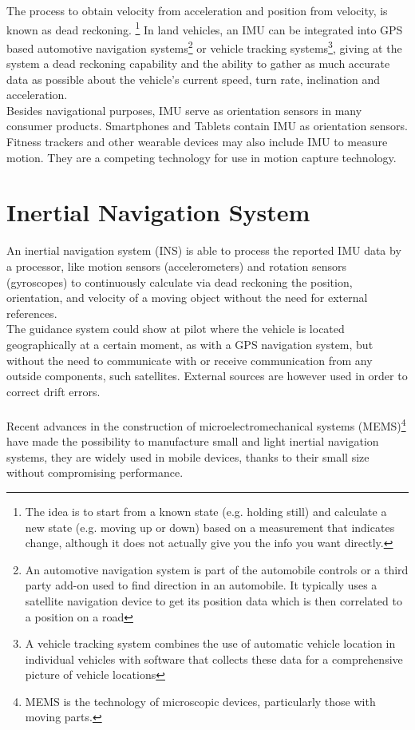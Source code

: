 \documentclass[tesi]{subfiles}
\begin{document}
The process to obtain velocity from acceleration and position from velocity, is known as dead reckoning. \footnote{The idea is to start from a known state (e.g. holding still) and calculate a new state (e.g. moving up or down) based on a measurement that indicates change, although it does not actually give you the info you want directly.}
In land vehicles, an IMU can be integrated into GPS based automotive navigation systems\footnote{An automotive navigation system is part of the automobile controls or a third party add-on used to find direction in an automobile. It typically uses a satellite navigation device to get its position data which is then correlated to a position on a road} or vehicle tracking systems\footnote{A vehicle tracking system combines the use of automatic vehicle location in individual vehicles with software that collects these data for a comprehensive picture of vehicle locations}, giving at the system a dead reckoning capability and the ability to gather as much accurate data as possible about the vehicle's current speed, turn rate, inclination and acceleration. \\
Besides navigational purposes, IMU serve as orientation sensors in many consumer products. Smartphones and Tablets contain IMU as orientation sensors. Fitness trackers and other wearable devices may also include IMU to measure motion.  They are a competing technology for use in motion capture technology\cite{motioncapture}.\clearpage
\section{Inertial Navigation System}\label{sc:Inertial Navigation System}
An inertial navigation system (INS) is able to process the reported IMU data by a processor, like motion sensors (accelerometers) and rotation sensors (gyroscopes) to continuously calculate via dead reckoning the position, orientation, and velocity of a moving object without the need for external references\cite{basicprincipleaereo}.\\ 
The guidance system could show at pilot where the vehicle is located geographically at a certain moment, as with a GPS navigation system, but without the need to communicate with or receive communication from any outside components, such satellites. External sources are however used in order to correct drift errors.\\\\Recent advances in the construction of microelectromechanical systems (MEMS)\footnote{MEMS is the technology of microscopic devices, particularly those with moving parts.} have made the possibility to manufacture small and light inertial navigation systems, they are widely used in mobile devices, thanks to their small size without compromising performance.\\
\end{document}
